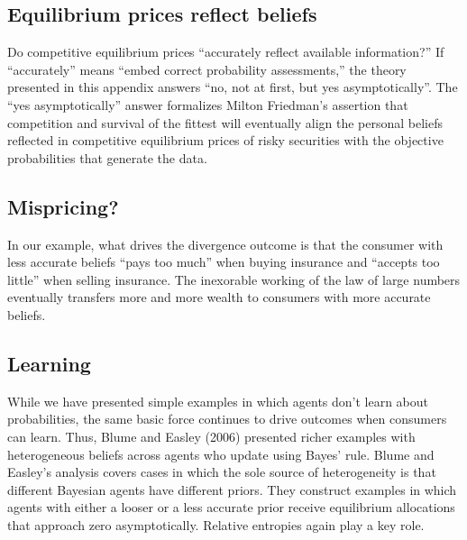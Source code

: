 




\subsection{Equilibrium prices reflect beliefs}

Do competitive equilibrium prices ``accurately reflect available information?''  If ``accurately'' means ``embed correct probability assessments,''
the theory presented in this appendix answers ``no, not at first, but yes asymptotically''.  The ``yes asymptotically'' answer formalizes
Milton Friedman's assertion that competition and survival of the fittest will eventually align the personal beliefs reflected in competitive equilibrium prices of
risky securities with the objective probabilities that generate the data.


\subsection{Mispricing?}

In our example, what drives the divergence outcome is that the consumer with  less accurate beliefs ``pays too much'' when buying  insurance
and ``accepts too little'' when selling insurance.  The inexorable working of the law of large numbers eventually transfers more and more wealth to  consumers with  more
accurate beliefs.

\subsection{Learning}

While we have presented simple examples in which agents don't learn about probabilities, the same basic force  continues to drive outcomes
when consumers can learn.
Thus, Blume and Easley (2006) presented richer examples with heterogeneous beliefs across agents who
 update  using Bayes' rule.
 Blume and Easley's  analysis covers cases  in which the sole source of heterogeneity is that different Bayesian
agents have different priors.  They construct examples in which    agents with either
 a looser  or a less accurate prior receive  equilibrium allocations that approach zero asymptotically.
 Relative entropies again play a key role.



